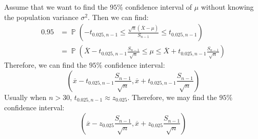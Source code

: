 \documentclass{huhtakm-template-book-v2}
\DeclareMathOperator{\prob}{\mathbb{P}}
\begin{document}
\begin{eg}
	Assume that we want to find the $95\%$ confidence interval of $\mu$ without knowing the population variance $\sigma^{2}$. Then we can find:
	\begin{align*}
		0.95&=\prob\left(-t_{0.025,n-1}\leq\frac{\sqrt{n}(\overline{X}-\mu)}{S_{n-1}}\leq t_{0.025,n-1}\right)\\
		&=\prob\left(\overline{X}-t_{0.025,n-1}\frac{S_{n-1}}{\sqrt{n}}\leq\mu\leq\overline{X}+t_{0.025,n-1}\frac{S_{n-1}}{\sqrt{n}}\right)
	\end{align*}
	Therefore, we can find the $95\%$ confidence interval:
	\begin{equation*}
		\left(\overline{x}-t_{0.025,n-1}\frac{S_{n-1}}{\sqrt{n}},\overline{x}+t_{0.025,n-1}\frac{S_{n-1}}{\sqrt{n}}\right)
	\end{equation*}
	Usually when $n>30$, $t_{0.025,n-1}\approx z_{0.025}$. Therefore, we may find the $95\%$ confidence interval:
	\begin{equation*}
		\left(\overline{x}-z_{0.025}\frac{S_{n-1}}{\sqrt{n}},\overline{x}+z_{0.025}\frac{S_{n-1}}{\sqrt{n}}\right)
	\end{equation*}
\end{eg}
\end{document}
